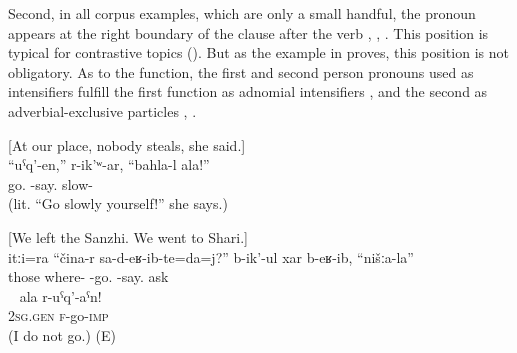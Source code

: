 Second, in all corpus examples, which are only a small handful, the  pronoun appears at the right boundary of the clause after the verb , , . This position is typical for contrastive topics (). But as the example in  proves, this position is not obligatory. As to the function, the first and second person  pronouns used as intensifiers fulfill the first function as adnomial intensifiers ,  and the second as adverbial-exclusive particles , .

\begin{exe}
		\ex	\label{You can leave on your own, she says, without worries.} [‎‎At our place, nobody steals, she said.]\\
		\gll	``uˁq'-en,''	r-ik'ʷ-ar,	``bahla-l	ala!''\\
			go.	-say.	slow-	 \\
		\glt	{} (lit. ``Go slowly yourself!'' she says.)
		
			\ex	\label{They asked us, where did you come from?} [We left the Sanzhi. We went to Shari.]\\
		\gll	itːi=ra	``čina-r	sa-d-eʁ-ib-te=da=j?''	b-ik'-ul	xar	b-eʁ-ib,	``nišːa-la''\\
			those	where-	-go.	-say.	ask		\\
		\glt	{} 
\
			\ex	\label{ex:(You) yourself go awayREFL}
		\gll	ala	r-uˁq'-aˁn!\\
			2\textsc{sg}.\textsc{gen}	\textsc{f}-go-\textsc{imp}\\
		\glt	{} (I do not go.) (E)
\end{exe}



